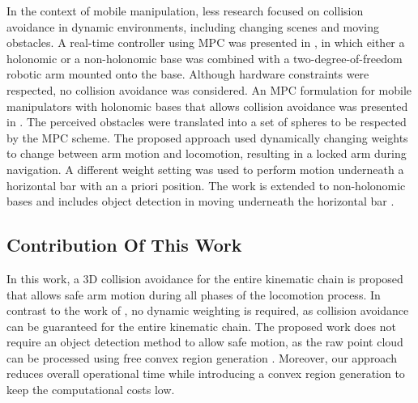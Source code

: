 In the context of mobile manipulation, less research focused on collision
avoidance in dynamic environments, including changing scenes and moving obstacles.
A real-time controller using MPC was presented in \cite{Ide2011}, in which either a holonomic or a non-holonomic base was combined with a two-degree-of-freedom robotic arm mounted onto the base. Although hardware constraints were respected, no collision avoidance was considered.  An MPC formulation for mobile manipulators with holonomic bases that allows collision avoidance was presented in \cite{Avanzini2015}. The perceived obstacles were translated into a set of spheres to be respected by the MPC scheme. The proposed approach used dynamically changing weights to change between arm motion and locomotion, resulting in a locked arm during navigation. A different weight setting was used to perform motion underneath a horizontal bar with an a priori position. 
The work is extended to non-holonomic bases and includes object detection in moving underneath the horizontal bar \cite{Avanzini2018}. 
%

\iffalse
We can summarize that in order to allow complex behaviors for mobile manipulators and to
decrease operational time, it is crucial to develop methods that deal with the coupled
robotic system. In the field of trajectory planning, model predictive control was
successfully tested for autonomous vehicles to allow navigation in highly dynamic
environments, which have not been exploited for mobile manipulators. Initial tests to
prove the applicability of this approach to control mobile manipulators in a coupled
manner have underlined the potential of this method.  However, no solution to reduce the
complexity as the number of obstacles increases has been proposed. Thus, the problem of
real-time collision avoidance for mobile manipulators remains unsolved.
\fi
\subsection{Contribution Of This Work}
In this work, a 3D collision avoidance for the entire kinematic chain is proposed that allows safe arm motion during all phases of the locomotion process. In contrast to the work of \cite{Avanzini2018}, no dynamic weighting is required, as collision avoidance can be guaranteed for the entire kinematic chain. The proposed work does not require an object detection method to allow safe motion, as the raw point cloud can be processed using free convex region generation \cite{Liu2017}. Moreover, our approach reduces overall operational time while introducing a convex region generation to keep the computational costs low. 
